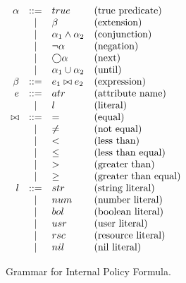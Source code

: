 \begin{table}[!ht]
    \centering
    $
    \begin{array}{rcll}
        \alpha     & ::=   & true              & \text{(true predicate)} \\
                & |     & \beta              & \text{(extension)} \\
                & |     & \alpha_1 \land \alpha_2 & \text{(conjunction)} \\
                & |     & \neg \alpha          & \text{(negation)} \\
                & |     & \bigcirc \alpha            & \text{(next)} \\
                & |     & \alpha_1 \cup \alpha_2    & \text{(until)} \\
        \beta    & ::=   & e_1 \bowtie e_2   & \text{(expression)} \\
        e       & ::=   & atr               & \text{(attribute name)} \\
                & |     & l                 & \text{(literal)} \\
        \bowtie & ::=   & =                 & \text{(equal)} \\
                & |     & \neq              & \text{(not equal)} \\
                & |     & <                 & \text{(less than)} \\
                & |     & \leq              & \text{(less than equal)} \\
                & |     & >                 & \text{(greater than)} \\
                & |     & \geq              & \text{(greater than equal)} \\
        l       & ::=   & str               & \text{(string literal)} \\
                & |     & num               & \text{(number literal)} \\
                & |     & bol               & \text{(boolean literal)} \\
                & |     & usr               & \text{(user literal)} \\
                & |     & rsc               & \text{(resource literal)} \\
                & |     & nil               & \text{(nil literal)}
    \end{array}
    $
    \caption{Grammar for Internal Policy Formula.}
    \label{tab:pf-grammar}
\end{table}